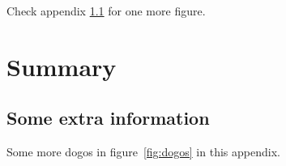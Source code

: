 \documentclass[12pt, a4paper, oneside]{article}
\begin{document}
Check appendix \ref{appendix:extra} for one more figure.

\clearpage


\section{Summary} \label{sec:summary}

\blindtext[3]

\clearpage


\nocite{*}

{
    \raggedright
    \printbibliography
}

\clearpage


\appendix
{} \label{sec:appendix}

\renewcommand{\thesubsection}{\Alph{subsection}}



\subsection{Some extra information} \label{appendix:extra}

Some more dogos in figure~\ref{fig:dogos} in this appendix.
\end{document}
